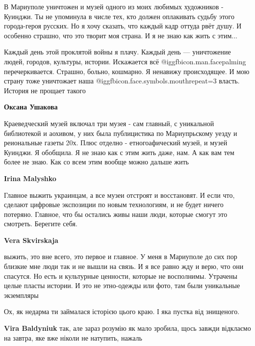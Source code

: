  
 
 
 
 
\zzSecCmt

\begin{itemize} %

В Мариуполе уничтожен и музей одного из моих любимых художников - Куинджи. Ты
не упоминула в числе тех, кто должен оплакивать судьбу этого города-героя
русских. Но я хочу сказать, что каждый кадр оттуда рвёт душу. И особенно
страшно, что это творит моя страна. И я не знаю как жить с этим...

Каждый день этой проклятой войны я плачу. Каждый день — уничтожение людей,
городов, культуры, истории. Искажается всё  @igg{fbicon.man.facepalming}   перечеркивается. Страшно,
больно, кошмарно. Я ненавижу происходящее. И мою страну тоже уничтожает наша
 @igg{fbicon.face.symbols.mouth}{repeat=3}  власть. История не прощает такого

\begin{itemize} %
\textbf{Оксана Ушакова} 

Краеведческий музей включал три музея - сам главный, с уникальной библиотекой и
аохивом, у них была публицистика по Мариупрьскому уезду и реиональные газеты
20х. Плюс отделно - етногоафический музей, и музей Куинджи. Я обобщила. Я не
знаю как с этим жить даже, нам. А как вам тем более не знаю. Как со всем этим
вообще можно дальше жить

\textbf{Irina Malyshko} 

Главное выжить украинцам, а все музеи отстроят и восстановят. И если что,
сделают цифровые экспозиции по новым технологиям, и не будет ничего потеряно.
Главное, что бы остались живы наши люди, которые смогут это смотреть. Берегите
себя.

\textbf{Vera Skvirskaja} 

выжить, это вне всего, это первое и главное. У меня в Мариуполе до сих пор
близкие мне люди так и не вышли на связь. И я все равно жду и верю, что они
спасутся. Но есть и культурные ценности, которые не восполнимы. Утрачены целые
пласты истории. И это не этно-одежды или фото, там были уникальные экземпляры

\end{itemize} %

Ох, як недарма ти займалася історією цього краю. І яка пустка від знищеного.

\textbf{Vira Baldyniuk} так, але зараз розумію як мало зробила, щось завжди відклаємо на завтра, яке вже ніколи не натупить, нажаль

\end{itemize} %
